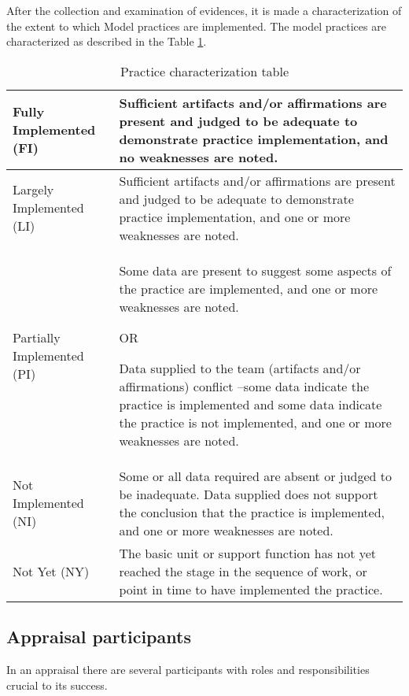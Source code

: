 \newpage
After the collection and examination of evidences, it is made a characterization of the extent to which Model practices are implemented. The model practices are characterized as described in the Table \ref{tab:characterizations}.
\newline

\begin{table}[h]
	\centering
	\caption{Practice characterization table}
	\begin{tabular}{|p{4cm}|p{9cm}|}
		\hline
		Fully Implemented (FI)   & Sufficient artifacts and/or affirmations are present and
		judged to be adequate to demonstrate practice implementation, and
		no weaknesses are noted.    \\
		\hline
		Largely Implemented (LI) & Sufficient artifacts and/or affirmations are present and
		judged to be adequate to demonstrate practice implementation, and
		one or more weaknesses are noted.  \\ 
		\hline
		Partially Implemented (PI) & Some data are present to suggest some aspects of the practice are
		implemented, and
		one or more weaknesses are noted.
		
		
		OR
		
		
		Data supplied to the team (artifacts and/or affirmations) conflict –some data
		indicate the practice is implemented and some data indicate the practice is
		not implemented, and
		one or more weaknesses are noted.\\
		\hline
		Not Implemented (NI) & Some or all data required are absent or judged to be
		inadequate.
		Data supplied does not support the conclusion that the practice is
		implemented, and
		one or more weaknesses are noted. \\
		\hline
		Not Yet (NY) & The basic unit or support function has not yet reached the stage in the
		sequence of work, or point in time to have implemented the practice. \\
		\hline
	\end{tabular}
	\label{tab:characterizations}
\end{table}





\subsection{Appraisal participants}
In an appraisal there are several participants with roles and responsibilities crucial to its success.


